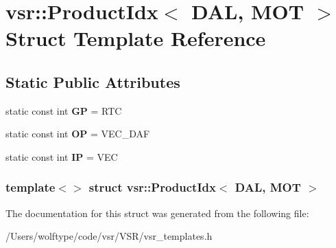\hypertarget{structvsr_1_1_product_idx_3_01_d_a_l_00_01_m_o_t_01_4}{\section{vsr\-:\-:Product\-Idx$<$ D\-A\-L, M\-O\-T $>$ Struct Template Reference}
\label{structvsr_1_1_product_idx_3_01_d_a_l_00_01_m_o_t_01_4}
}
\subsection*{Static Public Attributes}
\begin{DoxyCompactItemize}
\item 
\hypertarget{structvsr_1_1_product_idx_3_01_d_a_l_00_01_m_o_t_01_4_a85f7d6d41eb35c55acdfdcc9cf495a30}{static const int {\bfseries G\-P} = R\-T\-C}\label{structvsr_1_1_product_idx_3_01_d_a_l_00_01_m_o_t_01_4_a85f7d6d41eb35c55acdfdcc9cf495a30}

\item 
\hypertarget{structvsr_1_1_product_idx_3_01_d_a_l_00_01_m_o_t_01_4_a5e8f2789d404318222197511b5697ea2}{static const int {\bfseries O\-P} = V\-E\-C\-\_\-\-D\-A\-F}\label{structvsr_1_1_product_idx_3_01_d_a_l_00_01_m_o_t_01_4_a5e8f2789d404318222197511b5697ea2}

\item 
\hypertarget{structvsr_1_1_product_idx_3_01_d_a_l_00_01_m_o_t_01_4_ab425026b00106b6b12a69bb63691c389}{static const int {\bfseries I\-P} = V\-E\-C}\label{structvsr_1_1_product_idx_3_01_d_a_l_00_01_m_o_t_01_4_ab425026b00106b6b12a69bb63691c389}

\end{DoxyCompactItemize}
\subsubsection*{template$<$$>$ struct vsr\-::\-Product\-Idx$<$ D\-A\-L, M\-O\-T $>$}



The documentation for this struct was generated from the following file\-:\begin{DoxyCompactItemize}
\item 
/\-Users/wolftype/code/vsr/\-V\-S\-R/vsr\-\_\-templates.\-h\end{DoxyCompactItemize}
